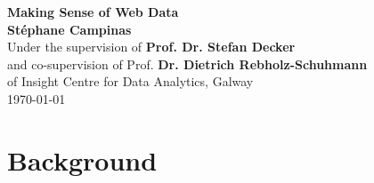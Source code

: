 \documentclass[12pt,chapterprefix=true]{scrbook}
\begin{document}
\begin{titlepage}
	\begin{center}
		\null
		\vspace{2cm}
		\vspace{2cm}
		{\Huge \textbf{Making Sense of Web Data}}\\
		\vspace{1cm}
		{\Large \textbf{St\'ephane Campinas}}\\
		\vspace{1cm}
		Under the supervision of \textbf{Prof. Dr. Stefan Decker}\\
		and co-supervision of Prof. \textbf{Dr. Dietrich Rebholz-Schuhmann}\\
		of Insight Centre for Data Analytics, Galway\\
		\vspace{2cm}
		\today
	\end{center}
\end{titlepage}




\cleardoubleoddpage
\setcounter{tocdepth}{1}
\tableofcontents
\cleardoubleoddpage
\listoffigures
\listoftables
\listoftheorems[ignoreall,show={definition},numwidth=3.5em]
\cleardoubleoddpage
{}

\part{Background}



\end{document}
